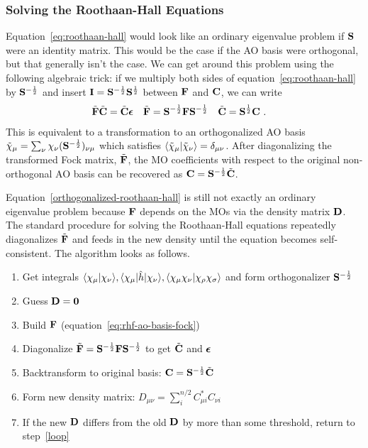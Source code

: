 \documentclass[11pt]{article}
\numberwithin{equation}{section}
\begin{document}
\subsubsection{Solving the Roothaan-Hall Equations}

Equation~\ref{eq:roothaan-hall} would look like an ordinary eigenvalue problem if $\mathbf{S}$ were an identity matrix.
This would be the case if the AO basis were orthogonal, but that generally isn't the case.
We can get around this problem using the following algebraic trick:
if we multiply both sides of equation~\ref{eq:roothaan-hall} by $\mathbf{S}^{-\frac{1}{2}}$ and insert $\mathbf{I}=\mathbf{S}^{-\frac{1}{2}}\mathbf{S}^{\frac{1}{2}}$ between $\mathbf{F}$ and $\mathbf{C}$, we can write
\begin{align}
\label{orthogonalized-roothaan-hall}
&
  \tl{\bo{F}}
  \tl{\bo{C}}
=
  \tl{\bo{C}}\bm\ev
&&
  \tl{\bo{F}}
=
  \bo{S}^{-\frac{1}{2}}\bo{F}\bo{S}^{-\frac{1}{2}}
&&
  \tl{\bo{C}}
=
  \bo{S}^{\frac{1}{2}}\bo{C}\ .
\end{align}
This is equivalent to a transformation to an orthogonalized AO basis $\tl\x_\mu=\sum_\nu\x_\nu (\bo{S}^{-\frac{1}{2}})_{\nu\mu}$ which satisfies $\ip{\tl\x_\mu|\tl\x_\nu}=\d_{\mu\nu}$.
After diagonalizing the transformed Fock matrix, $\tilde{\mathbf{F}}$, the MO coefficients with respect to the original non-orthogonal AO basis can be recovered as $\mathbf{C}=\mathbf{S}^{-\frac{1}{2}}\tilde{\mathbf{C}}$.

\begin{samepage}
Equation~\ref{orthogonalized-roothaan-hall} is still not exactly an ordinary eigenvalue problem because $\mathbf{F}$ depends on the MOs via the density matrix $\mathbf{D}$.
The standard procedure for solving the Roothaan-Hall equations repeatedly diagonalizes $\tilde{\mathbf{F}}$ and feeds in the new density until the equation becomes self-consistent.
The algorithm looks as follows.
\begin{enumerate}
  \item Get integrals $\ip{\x_\mu|\x_\nu}, \ip{\x_\mu|\op{h}|\x_\nu}, \ip{\x_\mu\x_\nu|\x_\rho\x_\si}$ and form orthogonalizer $\mathbf{S}^{-\frac{1}{2}}$
  \item Guess $\mathbf{D}=\mathbf{0}$
  \item\label{loop} Build $\mathbf{F}$ (equation~\ref{eq:rhf-ao-basis-fock})
  \item Diagonalize $\tilde{\mathbf{F}}=\mathbf{S}^{-\frac{1}{2}}\mathbf{F}\mathbf{S}^{-\frac{1}{2}}$ to get $\tilde{\mathbf{C}}$ and $\bm\ev$
  \item Backtransform to original basis: $\mathbf{C}=\mathbf{S}^{-\frac{1}{2}}\tilde{\mathbf{C}}$
  \item Form new density matrix: $D_{\mu\nu}=\sum_i^{n/2} C_{\mu i}^*C_{\nu i}$
  \item If the new $\mathbf{D}$ differs from the old $\mathbf{D}$ by more than some threshold, return to step~\ref{loop}
\end{enumerate}
\end{samepage}
\end{document}
